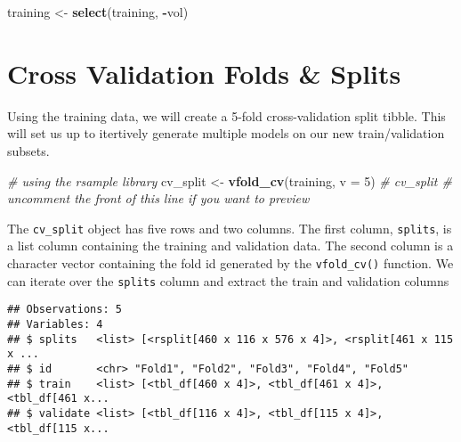 \documentclass[]{article}
\newenvironment{Shaded}{\begin{snugshade}}{\end{snugshade}}
\newcommand{\KeywordTok}[1]{\textcolor[rgb]{0.13,0.29,0.53}{\textbf{#1}}}
\newcommand{\DataTypeTok}[1]{\textcolor[rgb]{0.13,0.29,0.53}{#1}}
\newcommand{\DecValTok}[1]{\textcolor[rgb]{0.00,0.00,0.81}{#1}}
\newcommand{\StringTok}[1]{\textcolor[rgb]{0.31,0.60,0.02}{#1}}
\newcommand{\CommentTok}[1]{\textcolor[rgb]{0.56,0.35,0.01}{\textit{#1}}}
\newcommand{\OperatorTok}[1]{\textcolor[rgb]{0.81,0.36,0.00}{\textbf{#1}}}
\newcommand{\NormalTok}[1]{#1}
\begin{document}
\begin{Shaded}
\begin{Highlighting}[]
\NormalTok{training <-}\StringTok{ }\KeywordTok{select}\NormalTok{(training, }\OperatorTok{-}\NormalTok{vol)}
\end{Highlighting}
\end{Shaded}

\section{Cross Validation Folds \&
Splits}\label{cross-validation-folds-splits}

Using the training data, we will create a 5-fold cross-validation split
tibble. This will set us up to itertively generate multiple models on
our new train/validation subsets.

\begin{Shaded}
\begin{Highlighting}[]
\CommentTok{# using the rsample library}
\NormalTok{cv_split <-}\StringTok{ }\KeywordTok{vfold_cv}\NormalTok{(training, }\DataTypeTok{v =} \DecValTok{5}\NormalTok{)}
\CommentTok{# cv_split  # uncomment the front of this line if you want to preview}
\end{Highlighting}
\end{Shaded}

The \texttt{cv\_split} object has five rows and two columns. The first
column, \texttt{splits}, is a list column containing the training and
validation data. The second column is a character vector containing the
fold id generated by the \texttt{vfold\_cv()} function. We can iterate
over the \texttt{splits} column and extract the train and validation
columns

\begin{Shaded}
\end{Shaded}

\begin{verbatim}
## Observations: 5
## Variables: 4
## $ splits   <list> [<rsplit[460 x 116 x 576 x 4]>, <rsplit[461 x 115 x ...
## $ id       <chr> "Fold1", "Fold2", "Fold3", "Fold4", "Fold5"
## $ train    <list> [<tbl_df[460 x 4]>, <tbl_df[461 x 4]>, <tbl_df[461 x...
## $ validate <list> [<tbl_df[116 x 4]>, <tbl_df[115 x 4]>, <tbl_df[115 x...
\end{verbatim}
\end{document}
